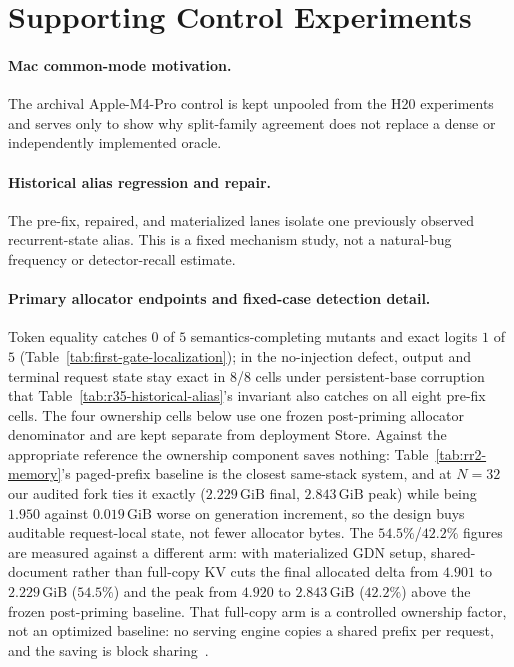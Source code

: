 \documentclass{article}
\newcommand{\gib}{\,\mathrm{GiB}}
\begin{document}
\FloatBarrier

\section{Supporting Control Experiments}
\label{app:controls}

\paragraph{Mac common-mode motivation.}
The archival Apple-M4-Pro control is kept unpooled from the H20 experiments and
serves only to show why split-family agreement does not replace a dense or
independently implemented oracle.


\paragraph{Historical alias regression and repair.}
The pre-fix, repaired, and materialized lanes isolate one previously observed
recurrent-state alias.  This is a fixed mechanism study, not a natural-bug
frequency or detector-recall estimate.


\paragraph{Primary allocator endpoints and fixed-case detection detail.}
Token equality catches $0$ of $5$ semantics-completing mutants and exact logits
$1$ of $5$ (Table~\ref{tab:first-gate-localization}); in the no-injection
defect, output and terminal request state stay exact in 8/8 cells under
persistent-base corruption that Table~\ref{tab:r35-historical-alias}'s invariant
also catches on all eight pre-fix cells.  The four ownership cells below use one
frozen post-priming allocator denominator and are kept separate from deployment
Store.
Against the appropriate reference the ownership component saves nothing:
Table~\ref{tab:rr2-memory}'s paged-prefix baseline is the closest same-stack
system, and at $N=32$ our audited fork ties it exactly ($2.229\gib$ final,
$2.843\gib$ peak) while being $1.950$ against $0.019\gib$ worse on generation
increment, so the design buys auditable request-local state, not fewer allocator
bytes.  The $54.5\%$/$42.2\%$ figures are measured against a different arm: with
materialized GDN setup, shared-document rather than full-copy KV cuts the final allocated
delta from $4.901$ to $2.229\gib$ ($54.5\%$) and the peak from $4.920$ to
$2.843\gib$ ($42.2\%$) above the frozen post-priming baseline.  That full-copy
arm is a controlled ownership factor, not an optimized baseline: no serving
engine copies a shared prefix per request, and the saving is block
sharing~\citep{kwon2023pagedattention}.

\end{document}
